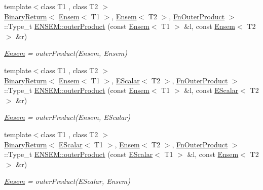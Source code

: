 \begin{DoxyCompactItemize}
{\footnotesize template$<$class T1 , class T2 $>$ }\\\mbox{\hyperlink{structENSEM_1_1BinaryReturn}{Binary\+Return}}$<$ \mbox{\hyperlink{classENSEM_1_1Ensem}{Ensem}}$<$ T1 $>$, \mbox{\hyperlink{classENSEM_1_1Ensem}{Ensem}}$<$ T2 $>$, \mbox{\hyperlink{structENSEM_1_1FnOuterProduct}{Fn\+Outer\+Product}} $>$\+::Type\+\_\+t \mbox{\hyperlink{group__eensem_ga2e9659bc245cd1b2e76ef274c78e26a3}{E\+N\+S\+E\+M\+::outer\+Product}} (const \mbox{\hyperlink{classENSEM_1_1Ensem}{Ensem}}$<$ T1 $>$ \&l, const \mbox{\hyperlink{classENSEM_1_1Ensem}{Ensem}}$<$ T2 $>$ \&r)
\begin{DoxyCompactList}\small\item\em \mbox{\hyperlink{classENSEM_1_1Ensem}{Ensem}} = outer\+Product(\+Ensem, Ensem) \end{DoxyCompactList}\item 
{\footnotesize template$<$class T1 , class T2 $>$ }\\\mbox{\hyperlink{structENSEM_1_1BinaryReturn}{Binary\+Return}}$<$ \mbox{\hyperlink{classENSEM_1_1Ensem}{Ensem}}$<$ T1 $>$, \mbox{\hyperlink{classENSEM_1_1EScalar}{E\+Scalar}}$<$ T2 $>$, \mbox{\hyperlink{structENSEM_1_1FnOuterProduct}{Fn\+Outer\+Product}} $>$\+::Type\+\_\+t \mbox{\hyperlink{group__eensem_ga13dd888cacbe0e5a3c85217eeb2c9002}{E\+N\+S\+E\+M\+::outer\+Product}} (const \mbox{\hyperlink{classENSEM_1_1Ensem}{Ensem}}$<$ T1 $>$ \&l, const \mbox{\hyperlink{classENSEM_1_1EScalar}{E\+Scalar}}$<$ T2 $>$ \&r)
\begin{DoxyCompactList}\small\item\em \mbox{\hyperlink{classENSEM_1_1Ensem}{Ensem}} = outer\+Product(\+Ensem, E\+Scalar) \end{DoxyCompactList}\item 
{\footnotesize template$<$class T1 , class T2 $>$ }\\\mbox{\hyperlink{structENSEM_1_1BinaryReturn}{Binary\+Return}}$<$ \mbox{\hyperlink{classENSEM_1_1EScalar}{E\+Scalar}}$<$ T1 $>$, \mbox{\hyperlink{classENSEM_1_1Ensem}{Ensem}}$<$ T2 $>$, \mbox{\hyperlink{structENSEM_1_1FnOuterProduct}{Fn\+Outer\+Product}} $>$\+::Type\+\_\+t \mbox{\hyperlink{group__eensem_ga63f92da09e74b21cf1e10e19dbbc9437}{E\+N\+S\+E\+M\+::outer\+Product}} (const \mbox{\hyperlink{classENSEM_1_1EScalar}{E\+Scalar}}$<$ T1 $>$ \&l, const \mbox{\hyperlink{classENSEM_1_1Ensem}{Ensem}}$<$ T2 $>$ \&r)
\begin{DoxyCompactList}\small\item\em \mbox{\hyperlink{classENSEM_1_1Ensem}{Ensem}} = outer\+Product(\+E\+Scalar, Ensem) \end{DoxyCompactList}\item 

\end{DoxyCompactItemize}
